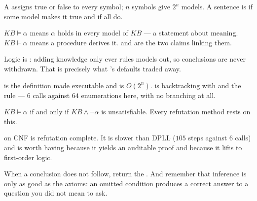 \begin{chaptersummary}
\begin{tight}
  \item A  assigns true or false to every symbol; $n$ symbols give
        $2^{n}$ models. A sentence is  if some model makes it
        true and  if all do.
  \item $\mathit{KB} \models \alpha$ means $\alpha$ holds in every model of
        $\mathit{KB}$ --- a statement about meaning. $\mathit{KB} \vdash \alpha$
        means a procedure derives it.  and  are
        the two claims linking them.
  \item Logic is : adding knowledge only ever rules models out, so
        conclusions are never withdrawn. That is precisely what 's
        defaults traded away.
  \item {} is the definition made executable and is $O(2^{n})$.
         is backtracking with  and the
         rule --- $6$ calls against $64$ enumerations here, with
        no branching at all.
  \item $\mathit{KB} \models \alpha$ if and only if $\mathit{KB} \wedge \neg\alpha$
        is unsatisfiable. Every refutation method rests on this.
  \item {} on CNF is refutation complete. It is slower than DPLL
        ($105$ steps against $6$ calls) and is worth having because it yields an
        auditable proof and because it lifts to first-order logic.
  \item When a conclusion does not follow, return the . And
        remember that inference is only as good as the axioms: an omitted condition
        produces a correct answer to a question you did not mean to ask.
\end{tight}
\end{chaptersummary}

